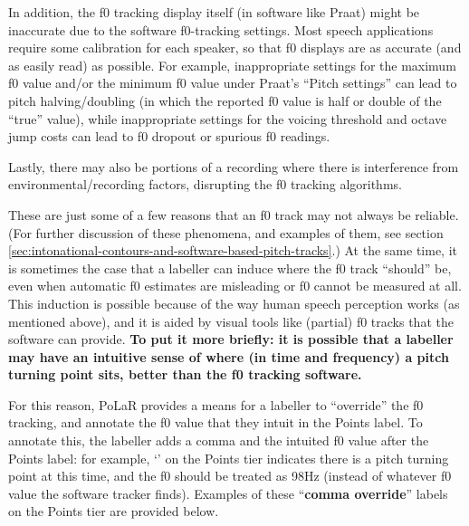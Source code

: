 \documentclass[11pt, twoside]{memoir}
\def\textlabel#1{{\relsize{-.5}\fontspec[Mapping=tex-text]{Roboto Mono}{#1}}}
\begin{document}
In addition, the f0 tracking display itself (in software like Praat) might be inaccurate due to the software f0-tracking settings. Most speech applications require some calibration for each speaker, so that f0 displays are as accurate (and as easily read) as possible. For example, inappropriate settings for the maximum f0 value and/or the minimum f0 value under Praat’s “Pitch settings” can lead to pitch halving\slash doubling (in which the reported f0 value is half or double of the “true” value), while inappropriate settings for the voicing threshold and octave jump costs can lead to f0 dropout or spurious f0 readings.

Lastly, there may also be portions of a recording where there is interference from environmental\slash recording factors, disrupting the f0 tracking algorithms.

These are just some of a few reasons that an f0 track may not always be reliable. (For further discussion of these phenomena, and examples of them, see section \ref{sec:intonational-contours-and-software-based-pitch-tracks}.) At the same time, it is sometimes the case that a labeller can induce where the f0 track “should” be, even when automatic f0 estimates are misleading or f0 cannot be measured at all. This induction is possible because of the way human speech perception works (as mentioned above), and it is aided by visual tools like (partial) f0 tracks that the software can provide. \textbf{To put it more briefly: it is possible that a labeller may have an intuitive sense of where (in time and frequency) a pitch turning point sits, better than the f0 tracking software.}

For this reason, PoLaR provides a means for a labeller to “override” the f0 tracking, and annotate the f0 value that they intuit in the Points label. To annotate this, the labeller adds a comma and the intuited f0 value after the Points label: for example, ‘\textlabel{0,98}’ on the Points tier indicates there is a pitch turning point at this time, and the f0 should be treated as 98Hz (instead of whatever f0 value the software tracker finds). Examples of these “\textbf{comma override}” labels on the Points tier are provided below.
\end{document}
